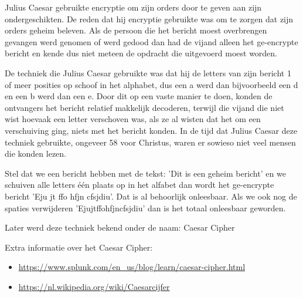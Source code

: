 Julius Caesar gebruikte encryptie om zijn orders door te geven aan zijn ondergeschikten. De reden dat hij encryptie gebruikte was om te zorgen dat zijn orders geheim beleven. Als de persoon die het bericht moest overbrengen gevangen werd genomen of werd gedood dan had de vijand alleen het ge-encrypte bericht en kende dus niet meteen de opdracht die uitgevoerd moest worden.

De techniek die Julius Caesar gebruikte was dat hij de letters van zijn bericht 1 of meer posities op schoof in het alphabet, dus een a werd dan bijvoorbeeld een d en een b werd dan een e. Door dit op een vaste manier te doen, konden de ontvangers het bericht relatief makkelijk decoderen, terwijl die vijand die niet wist hoevaak een letter verschoven was, als ze al wisten dat het om een verschuiving ging, niets met het bericht konden. In de tijd dat Julius Caesar deze techniek gebruikte, ongeveer 58 voor Christus, waren er sowieso niet veel mensen die konden lezen.

Stel dat we een bericht hebben met de tekst: 'Dit is een geheim bericht' en we schuiven alle letters één plaats op in het alfabet dan wordt het ge-encrypte bericht 'Eju jt ffo hfjn cfsjdiu'. Dat is al behoorlijk onleesbaar. Als we ook nog de spaties verwijderen 'Ejujtffohfjncfsjdiu' dan is het totaal onleesbaar geworden.

Later werd deze techniek bekend onder de naam: Caesar Cipher

Extra informatie over het Caesar Cipher:
\begin{itemize}
	\item \url{https://www.splunk.com/en\_us/blog/learn/caesar-cipher.html}
	\item \url{https://nl.wikipedia.org/wiki/Caesarcijfer}
\end{itemize}

